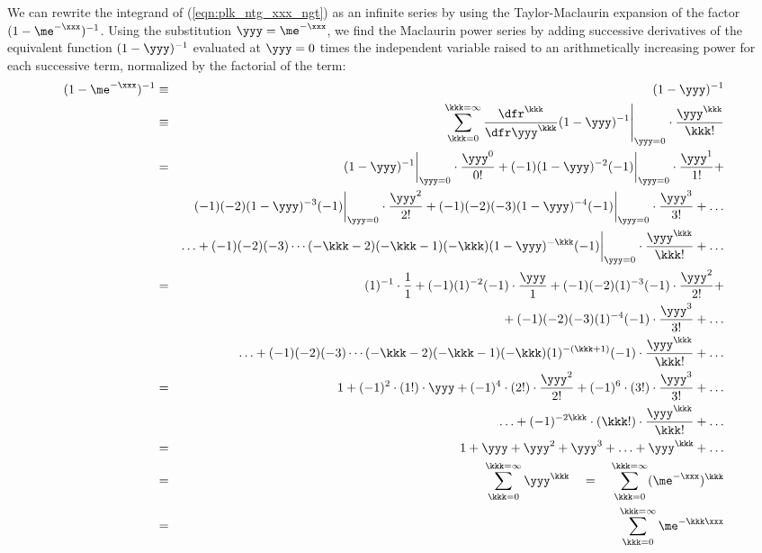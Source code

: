 \documentclass[12pt]{article}
\begin{document}
We can rewrite the integrand of (\ref{eqn:plk_ntg_xxx_ngt}) as an
infinite series by using the Taylor-Maclaurin expansion of the factor
$(1 - \me^{-\xxx})^{-1}$.
Using the substitution $\yyy = \me^{-\xxx}$, we find the Maclaurin
power series by adding successive derivatives of the equivalent
function $(1-\yyy)^{-1}$ evaluated at $\yyy = 0$ times the 
independent variable raised to an arithmetically increasing power 
for each successive term, normalized by the factorial of the term:
\begin{eqnarray}
  (1-\me^{-\xxx})^{-1} & \equiv & (1-\yyy)^{-1} \nonumber \\
  & \equiv & \left. \sum_{\kkk=0}^{\kkk=\infty}
  \frac{\dfr^{\kkk}}{\dfr \yyy^{\kkk}} (1 - \yyy)^{-1} \right|_{\yyy=0}
  \cdot \frac{\yyy^{\kkk}}{\kkk!} \nonumber \\
  & = & 
  (1 - \yyy)^{-1} \bigg|_{\yyy=0} \cdot \frac{\yyy^{0}}{0!} + 
  (-1)(1 - \yyy)^{-2}(-1) \bigg|_{\yyy=0} \cdot \frac{\yyy^{1}}{1!} + \nonumber \\
  & & 
  {} (-1)(-2)(1 - \yyy)^{-3}(-1) \bigg|_{\yyy=0} \cdot \frac{\yyy^{2}}{2!} + 
  (-1)(-2)(-3)(1 - \yyy)^{-4}(-1) \bigg|_{\yyy=0} \cdot \frac{\yyy^{3}}{3!} + \ldots \nonumber \\ 
  & & 
  \ldots + 
  (-1)(-2)(-3) \cdots (-\kkk - 2)(-\kkk - 1)(-\kkk) (1 - \yyy)^{-\kkk}(-1) \bigg|_{\yyy=0} \cdot \frac{\yyy^{\kkk}}{\kkk!} + \ldots \nonumber \\
  & = & 
  (1)^{-1} \cdot \frac{1}{1} + 
  (-1)(1)^{-2}(-1) \cdot \frac{\yyy}{1} + 
  (-1)(-2)(1)^{-3}(-1) \cdot \frac{\yyy^{2}}{2!} + \nonumber \\
  & & 
  {} + (-1)(-2)(-3)(1)^{-4}(-1) \cdot \frac{\yyy^{3}}{3!} + \ldots \nonumber \\
  & & 
  \ldots + (-1)(-2)(-3) \cdots (-\kkk - 2)(-\kkk - 1)(-\kkk) (1)^{-(\kkk+1)} (-1) \cdot \frac{\yyy^{\kkk}}{\kkk!} + \ldots
  \nonumber \\
  & = & 
  1 + 
  (-1)^{2} \cdot (1!) \cdot \yyy + 
  (-1)^{4} \cdot (2!) \cdot \frac{\yyy^{2}}{2!} + 
  (-1)^{6} \cdot (3!) \cdot \frac{\yyy^{3}}{3!} + \ldots \nonumber \\
  & & 
  \ldots + (-1)^{-2\kkk} \cdot (\kkk!) \cdot \frac{\yyy^{\kkk}}{\kkk!} + \ldots \nonumber \\
  & = & 
  1 + \yyy + \yyy^{2} + \yyy^{3} + \ldots + \yyy^{\kkk} + \ldots \nonumber \\
  & = & 
  \sum_{\kkk=0}^{\kkk=\infty} \yyy^{\kkk} \quad = \quad \sum_{\kkk=0}^{\kkk=\infty} (\me^{-\xxx})^{\kkk} \nonumber \\  
  & = & 
  \sum_{\kkk=0}^{\kkk=\infty} \me^{-\kkk\xxx}
\label{eqn:tyl_mcl_srs}
\end{eqnarray}
\end{document}
